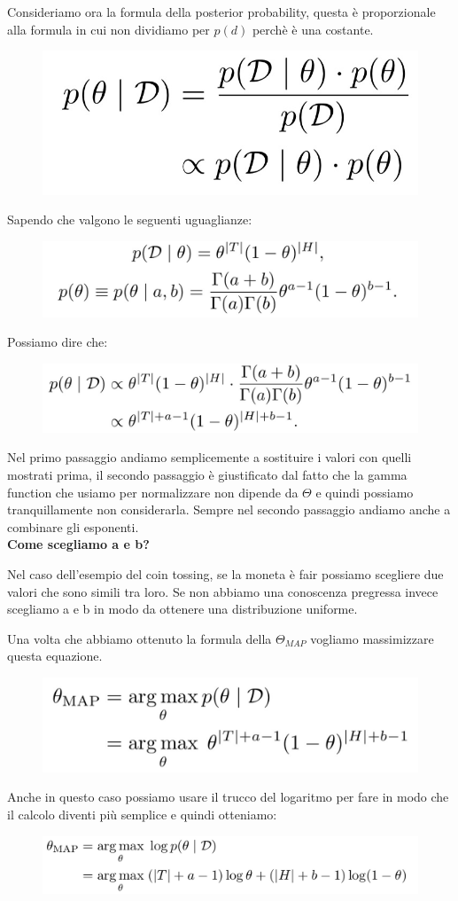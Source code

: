 \documentclass[14pt]{extreport}
\begin{document}
Consideriamo ora la formula della posterior probability, questa è proporzionale alla formula in cui non dividiamo per $p(d)$ perchè è una costante. 

\begin{figure}[H]
\centering
\includegraphics[width=0.3\linewidth]{37.jpeg}
\end{figure}

Sapendo che valgono le seguenti uguaglianze:
\begin{figure}[H]
\centering
\includegraphics[width=0.7\linewidth]{38.jpeg}
\end{figure}

Possiamo dire che:

\begin{figure}[H]
\centering
\includegraphics[width=0.7\linewidth]{39.jpeg}
\end{figure}

Nel primo passaggio andiamo semplicemente a sostituire i valori con quelli mostrati prima, il secondo passaggio è giustificato dal fatto che la gamma
function che usiamo per normalizzare non dipende da $\Theta$ e quindi possiamo tranquillamente non considerarla. Sempre nel secondo passaggio andiamo
anche a combinare gli esponenti. \\
\textbf{Come scegliamo a e b?}

Nel caso dell'esempio del coin tossing, se la moneta è fair possiamo scegliere due valori che sono simili tra loro. Se non abbiamo una conoscenza
pregressa invece scegliamo a e b in modo da ottenere una distribuzione uniforme.


Una volta che abbiamo ottenuto la formula della $\Theta_{MAP}$ vogliamo massimizzare questa equazione.
\begin{figure}[H]
\centering
\includegraphics[width=0.5\linewidth]{40.jpeg}
\end{figure}
Anche in questo caso possiamo usare il trucco del logaritmo per fare in modo che il calcolo diventi più semplice e quindi otteniamo:
\begin{figure}[H]
\centering
\includegraphics[width=0.7\linewidth]{41.jpeg}
\end{figure}
\end{document}
